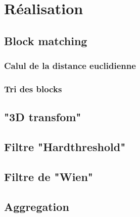 
\chapter{Réalisation}
\section{Block matching}
\subsection{Calul de la distance euclidienne}
\subsection{Tri des blocks}
\section{"3D transfom"}
\section{Filtre "Hardthreshold"}
\section{Filtre de "Wien"}
\section{Aggregation}
